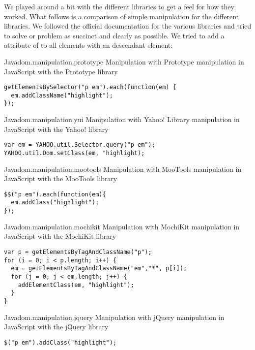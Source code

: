 We played around a bit with the different libraries to get a feel for how
they worked. What follows is a comparison of simple  manipulation
for the different libraries. We followed the official documentation for the
various libraries and tried to solve or problem as succinct and clearly as
possible. We tried to add a  attribute of  to
all  elements with an descendant  element: 

\begin{scode}{Java}{dom.manipulation.prototype}{%
   Manipulation with Prototype}{%
   manipulation in JavaScript with the Prototype library}
\begin{lstlisting}
getElementsBySelector("p em").each(function(em) {
  em.addClassName("highlight");
});
\end{lstlisting}
\end{scode}

\begin{scode}{Java}{dom.manipulation.yui}{%
   Manipulation with Yahoo!  Library}{%
   manipulation in JavaScript with the Yahoo!  library}
\begin{lstlisting}
var em = YAHOO.util.Selector.query("p em"); 
YAHOO.util.Dom.setClass(em, "highlight);
\end{lstlisting}
\end{scode}

\begin{scode}{Java}{dom.manipulation.mootools}{%
   Manipulation with MooTools}{%
   manipulation in JavaScript with the MooTools library}
\begin{lstlisting}
$$("p em").each(function(em){
  em.addClass("highlight");
});
\end{lstlisting}
\end{scode}

\begin{scode}{Java}{dom.manipulation.mochikit}{%
   Manipulation with MochiKit}{%
   manipulation in JavaScript with the MochiKit library}
\begin{lstlisting}
var p = getElementsByTagAndClassName("p");
for (i = 0; i < p.length; i++) {
  em = getElementsByTagAndClassName("em","*", p[i]);
  for (j = 0; j < em.length; j++) {
    addElementClass(em, "highlight");
  }
}
\end{lstlisting}
\end{scode}

\begin{scode}{Java}{dom.manipulation.jquery}{%
   Manipulation with jQuery}{%
   manipulation in JavaScript with the jQuery library}
\begin{lstlisting}
$("p em").addClass("highlight");
\end{lstlisting}
\end{scode}

